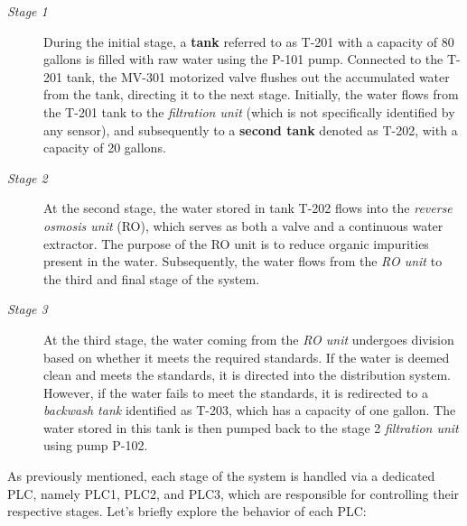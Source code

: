 \bigskip
\begin{description}
	\item[\textit{Stage 1}] During the initial stage, a \textbf{tank} referred to as T-201 with a capacity of 80 gallons is filled with raw water using the P-101 pump. Connected to the T-201 tank, the MV-301 motorized valve flushes out the accumulated water from the tank, directing it to the next stage. Initially, the water flows from the T-201 tank to the \textit{filtration unit} (which is not specifically identified by any sensor), and subsequently to a \textbf{second tank} denoted as T-202, with a capacity of 20 gallons.
	
	\item[\textit{Stage 2}] At the second stage, the water stored in tank T-202 flows into the \textit{reverse osmosis unit} (RO), which serves as both a valve and a continuous water extractor. The purpose of the RO unit is to reduce organic impurities present in the water. Subsequently, the water flows from the \textit{RO unit} to the third and final stage of the system.
	
	\item[\textit{Stage 3}] At the third stage, the water coming from the \textit{RO unit} undergoes division based on whether it meets the required standards. If the water is deemed clean and meets the standards, it is directed into the distribution system. However, if the water fails to meet the standards, it is redirected to a \textit{backwash tank} identified as T-203, which has a capacity of one gallon. The water stored in this tank is then pumped back to the stage 2 \textit{filtration unit} using pump P-102.
\end{description}

As previously mentioned, each stage of the system is handled via a dedicated PLC, namely PLC1, PLC2, and PLC3, which are responsible for controlling their respective stages. Let's briefly explore the behavior of each PLC:

